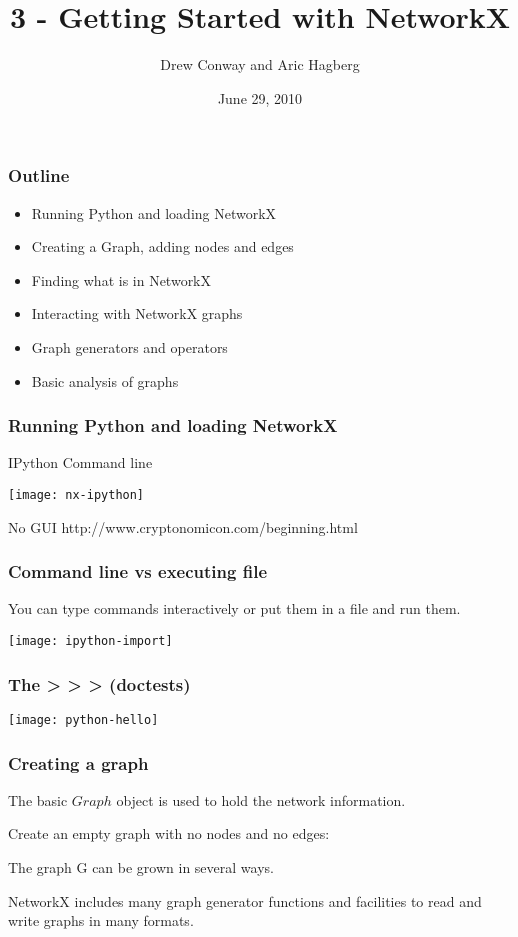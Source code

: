 \documentclass[xcolor=dvipsnames, 9pt]{beamer}
\title{3 - Getting Started with NetworkX}
\author{Drew Conway and Aric Hagberg}
\date{June 29, 2010}
\begin{document}
\begin{frame}[plain]
\titlepage
\end{frame}

\begin{frame}
\frametitle{Outline}
\begin{itemize}
\item Running Python and loading NetworkX
\item Creating a Graph, adding nodes and edges
\item Finding what is in NetworkX
\item Interacting with NetworkX graphs
\item Graph generators and operators
\item Basic analysis of graphs
\end{itemize}
\end{frame}

\begin{frame}
\frametitle{Running Python and loading NetworkX}
IPython Command line 
\centerline{\texttt{[image: nx-ipython]}}
No GUI \footnotesize{http://www.cryptonomicon.com/beginning.html}
\end{frame}

\begin{frame}
\frametitle{Command line vs executing file}
You can type commands interactively or put them in a file and run them.
\centerline{\texttt{[image: ipython-import]}}
\end{frame}

\begin{frame}
\frametitle{The > > > (doctests)}
\centerline{\texttt{[image: python-hello]}}

\end{frame}

\begin{frame}
\frametitle{Creating a graph}

The basic $Graph$ object is used to hold the network information.

Create an empty graph with no nodes and no edges:

\begin{block}{}

\end{block}

The graph G can be grown in several ways.

NetworkX includes many graph generator functions 
and facilities to read and write graphs in many formats.
\end{frame}
\end{document}
